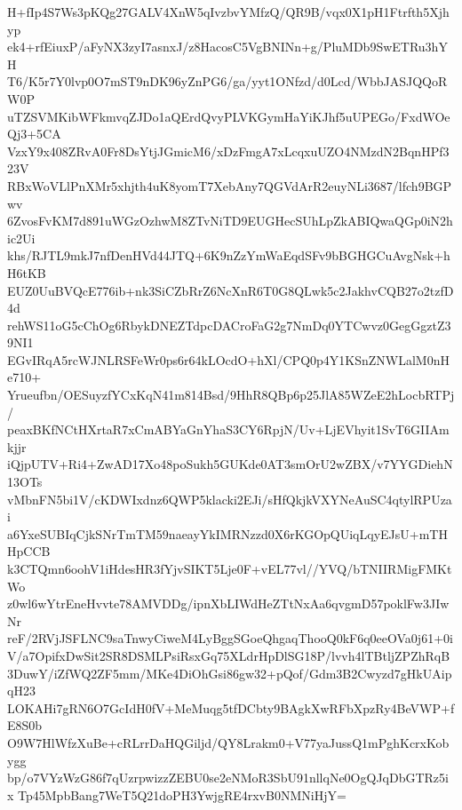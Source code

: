 H+fIp4S7Ws3pKQg27GALV4XnW5qIvzbvYMfzQ/QR9B/vqx0X1pH1Ftrfth5Xjhyp
ek4+rfEiuxP/aFyNX3zyI7asnxJ/z8HacosC5VgBNINn+g/PluMDb9SwETRu3hYH
T6/K5r7Y0lvp0O7mST9nDK96yZnPG6/ga/yyt1ONfzd/d0Lcd/WbbJASJQQoRW0P
uTZSVMKibWFkmvqZJDo1aQErdQvyPLVKGymHaYiKJhf5uUPEGo/FxdWOeQj3+5CA
VzxY9x408ZRvA0Fr8DsYtjJGmicM6/xDzFmgA7xLcqxuUZO4NMzdN2BqnHPf323V
RBxWoVLlPnXMr5xhjth4uK8yomT7XebAny7QGVdArR2euyNLi3687/lfch9BGPwv
6ZvosFvKM7d891uWGzOzhwM8ZTvNiTD9EUGHecSUhLpZkABIQwaQGp0iN2hic2Ui
khs/RJTL9mkJ7nfDenHVd44JTQ+6K9nZzYmWaEqdSFv9bBGHGCuAvgNsk+hH6tKB
EUZ0UuBVQcE776ib+nk3SiCZbRrZ6NcXnR6T0G8QLwk5c2JakhvCQB27o2tzfD4d
rehWS11oG5cChOg6RbykDNEZTdpcDACroFaG2g7NmDq0YTCwvz0GegGgztZ39NI1
EGvIRqA5rcWJNLRSFeWr0ps6r64kLOcdO+hXl/CPQ0p4Y1KSnZNWLalM0nHe710+
Yrueufbn/OESuyzfYCxKqN41m814Bsd/9HhR8QBp6p25JlA85WZeE2hLocbRTPj/
peaxBKfNCtHXrtaR7xCmABYaGnYhaS3CY6RpjN/Uv+LjEVhyit1SvT6GIIAmkjjr
iQjpUTV+Ri4+ZwAD17Xo48poSukh5GUKde0AT3smOrU2wZBX/v7YYGDiehN13OTs
vMbnFN5bi1V/cKDWIxdnz6QWP5klacki2EJi/sHfQkjkVXYNeAuSC4qtylRPUzai
a6YxeSUBIqCjkSNrTmTM59naeayYkIMRNzzd0X6rKGOpQUiqLqyEJsU+mTHHpCCB
k3CTQmn6oohV1iHdesHR3fYjvSIKT5Lje0F+vEL77vl//YVQ/bTNIIRMigFMKtWo
z0wl6wYtrEneHvvte78AMVDDg/ipnXbLIWdHeZTtNxAa6qvgmD57poklFw3JIwNr
reF/2RVjJSFLNC9saTnwyCiweM4LyBggSGoeQhgaqThooQ0kF6q0eeOVa0j61+0i
V/a7OpifxDwSit2SR8DSMLPsiRsxGq75XLdrHpDlSG18P/lvvh4lTBtljZPZhRqB
3DuwY/iZfWQ2ZF5mm/MKe4DiOhGsi86gw32+pQof/Gdm3B2Cwyzd7gHkUAipqH23
LOKAHi7gRN6O7GcIdH0fV+MeMuqg5tfDCbty9BAgkXwRFbXpzRy4BeVWP+fE8S0b
O9W7HlWfzXuBe+cRLrrDaHQGiljd/QY8Lrakm0+V77yaJussQ1mPghKcrxKobygg
bp/o7VYzWzG86f7qUzrpwizzZEBU0se2eNMoR3SbU91nllqNe0OgQJqDbGTRz5ix
Tp45MpbBang7WeT5Q21doPH3YwjgRE4rxvB0NMNiHjY=
